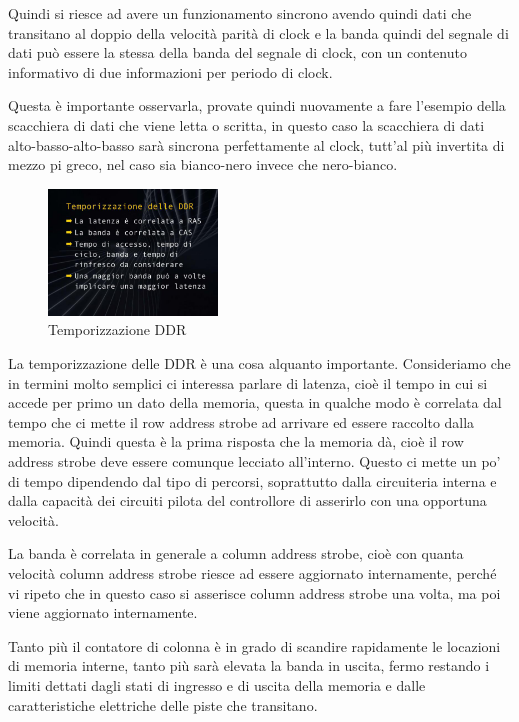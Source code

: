 Quindi si riesce ad avere un funzionamento sincrono avendo quindi dati che transitano al doppio della velocità parità di clock e la banda quindi del segnale di dati può essere la stessa della banda del segnale di clock, con un contenuto informativo di due informazioni per periodo di clock.

Questa è importante osservarla, provate quindi nuovamente a fare l'esempio della scacchiera di dati che viene letta o scritta, in questo caso la scacchiera di dati alto-basso-alto-basso sarà sincrona perfettamente al clock, tutt'al più invertita di mezzo pi greco, nel caso sia bianco-nero invece che nero-bianco.

\FloatBarrier
\begin{figure}[H]
  \centering
  \includegraphics[width=0.40\textwidth,
                    trim=40 80 10 40, %
                    clip]
                    {images/Lez05_p01_fig_05.png}
  \caption{Temporizzazione DDR}
  \label{fig:Lez05_p01_fig_05}
\end{figure}
\FloatBarrier
\noindent


La temporizzazione delle DDR è una cosa alquanto importante.
Consideriamo che in termini molto semplici ci interessa parlare di latenza, cioè il tempo in cui si accede per primo un dato della memoria, questa in qualche modo è correlata dal tempo che ci mette il row address strobe ad arrivare ed essere raccolto dalla memoria. Quindi questa è la prima risposta che la memoria dà, cioè il row address strobe deve essere comunque lecciato all'interno. Questo ci mette un po' di tempo dipendendo dal tipo di percorsi, soprattutto dalla circuiteria interna e dalla capacità dei circuiti pilota del controllore di asserirlo con una opportuna velocità.

La banda è correlata in generale a column address strobe, cioè con quanta velocità column address strobe riesce ad essere aggiornato internamente, perché vi ripeto che in questo caso si asserisce column address strobe una volta, ma poi viene aggiornato internamente.

Tanto più il contatore di colonna è in grado di scandire rapidamente le locazioni di memoria interne, tanto più sarà elevata la banda in uscita, fermo restando i limiti dettati dagli stati di ingresso e di uscita della memoria e dalle caratteristiche elettriche delle piste che transitano.

